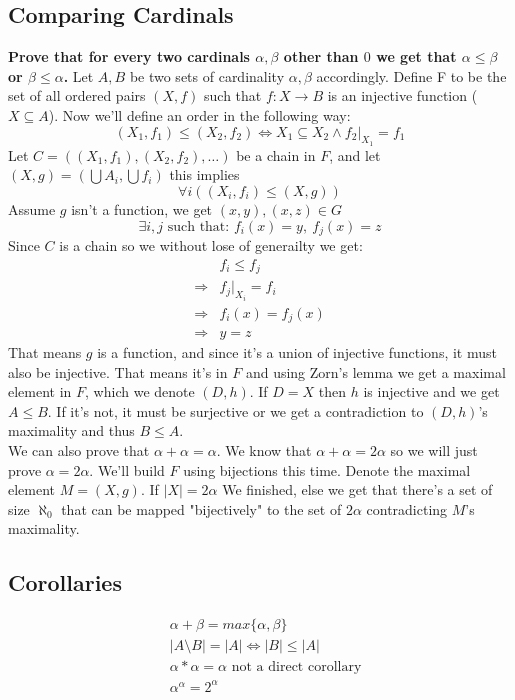 \documentclass{article}
\theoremstyle{plain}
\begin{document}
\subsection{Comparing Cardinals}
\textbf{Prove that for every two cardinals $\alpha,\beta$ other than $0$
we get that $\alpha\le\beta$ or $\beta\le\alpha$.}
Let $A,B$ be two sets of cardinality $\alpha, \beta$ accordingly.
Define F to be the set of all ordered pairs $(X,f)$ such that 
$f \colon X \to B$ is an injective function ($X\subseteq A$).
Now we'll define an order in the following way:
\[
	(X_1,f_1) \le (X_2,f_2) \iff X_1 \subseteq X_2 \land f_2|_{X_1}=f_1
\]
Let $C=((X_1,f_1),(X_2,f_2),\ldots)$ be a chain in $F$, and let 
$(X,g) = (\bigcup A_{i},\bigcup f_i)$ this implies
\[
	\forall i((X_i,f_i)\le(X,g))
\]
Assume $g$ isn't a function, we get $(x,y),(x,z)\in G$
\[ 
	\exists i,j \text{ such that: } f_i(x)=y,\ f_j(x)=z
\]
Since $C$ is a chain so we without lose of generailty we get:
\begin{align*}
&f_i\le f_j \\
\Rightarrow &f_j|_{X_i}=f_i \\
\Rightarrow &f_i(x)=f_j(x) \\
\Rightarrow &y=z
\end{align*}
\noindent That means $g$ is a function, and since it's a union of 
injective functions, it must also be injective. That means it's 
in $F$ and using Zorn's lemma we get a maximal element in $F$, 
which we denote $(D,h)$. If $D=X$ then $h$ is injective and we 
get $A \le B$. If it's not, it must be surjective or we get a 
contradiction to $(D,h)$'s maximality and thus $B\le A$. \\
We can also prove that $\alpha+\alpha=\alpha$. 
We know that $\alpha+\alpha=2\alpha$ so we will just prove 
$\alpha=2\alpha$. We'll build $F$ using bijections this time. 
Denote the maximal element $M=(X,g)$. If $|X|=2\alpha$ We finished, 
else we get that there's a set of size $\aleph_0$ that can be 
mapped "bijectively" to the set of $2\alpha$ contradicting $M$'s maximality.

\subsection{Corollaries}
\begin{align*}
&\alpha+\beta=max\{\alpha,\beta\} \\
&|A\setminus B|=|A| \iff |B|\le|A| \\
&\alpha*\alpha=\alpha \text{ not a direct corollary} \\
&\alpha^\alpha=2^\alpha
\end{align*}
\end{document}
